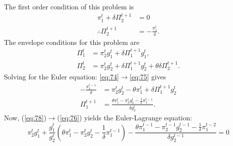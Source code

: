The first order condition of this problem is
\begin{align}
  \pi^t_1 + \delta \Pi^{t+1}_2 &= 0 \\  \label{eq:74}
  \therefore \Pi^{t+1}_2 &= -\frac{\pi^t_1}\delta.
\end{align}
The envelope conditions for this problem are
\begin{align}
\label{eq:75}
  \Pi^t_1 &= \pi^t_2g^t_1 + \delta \Pi^{t+1}_1g^t_1, \\ \label{eq:76}
  \Pi^t_2 &= \pi^t_2g^t_2 + \delta \Pi^{t+1}_1g^t_2 + \theta\delta\Pi^{t+1}_2.
\end{align}
Solving for the Euler equation:
\eqref{eq:74}$\to$\eqref{eq:75} gives
\begin{align}
\label{eq:77}
  -\frac{\pi^{t-1}_1}\delta &= \pi^t_2g^t_2 - \theta\pi^t_1 + \delta
  \Pi^{t+1}_1g^t_2 \\\label{eq:78}
  \Pi^{t+1}_1 &= \frac{\theta\pi^t_1 - \pi^t_2g^t_2 -
    \frac{1}\delta\pi^{t-1}_1}{\delta g^t_2}.
\end{align}
Now, (\ref{eq:78})$\rightarrow$(\ref{eq:76}) yields the Euler-Lagrange
equation:
\begin{equation}
\label{eq:79}
  \pi^t_2g^t_1 + \frac{g^t_1}{g^t_2} \left( \theta \pi^t_1 -
    \pi^t_2g^t_2 - \frac{1}\delta\pi^{t-1}_1 \right) -
  \frac{\theta\pi^{t-1}_1 - \pi^{t-1}_2g^{t-1}_2 -
    \frac{1}\delta\pi^{t-2}_1}{\delta g^{t-1}_2} = 0
\end{equation}


